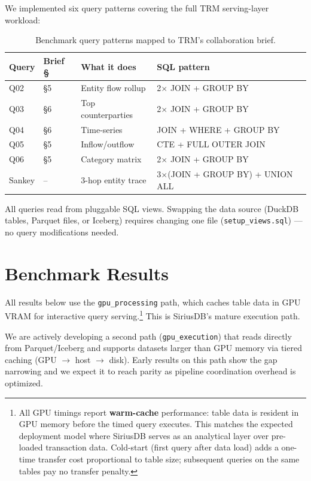 \documentclass[11pt,a4paper]{article}
\begin{document}
\noindent We implemented six query patterns covering the full TRM serving-layer workload:

\begin{table}[H]
\centering
\small
\begin{tabular}{@{}llll@{}}
\toprule
\textbf{Query} & \textbf{Brief \S} & \textbf{What it does} & \textbf{SQL pattern} \\
\midrule
Q02 & \S5 & Entity flow rollup & 2$\times$ JOIN + GROUP BY \\
Q03 & \S6 & Top counterparties & 2$\times$ JOIN + GROUP BY \\
Q04 & \S6 & Time-series & JOIN + WHERE + GROUP BY \\
Q05 & \S5 & Inflow/outflow & CTE + FULL OUTER JOIN \\
Q06 & \S5 & Category matrix & 2$\times$ JOIN + GROUP BY \\
Sankey & -- & 3-hop entity trace & 3$\times$(JOIN + GROUP BY) + UNION ALL \\
\bottomrule
\end{tabular}
\caption{Benchmark query patterns mapped to TRM's collaboration brief.}
\end{table}

All queries read from pluggable SQL views. Swapping the data source (DuckDB
tables, Parquet files, or Iceberg) requires changing one file
(\texttt{setup\_views.sql}) --- no query modifications needed.

\section{Benchmark Results}

All results below use the \texttt{gpu\_processing} path, which caches table
data in GPU VRAM for interactive query serving.\footnote{All GPU timings
report \textbf{warm-cache} performance: table data is resident in GPU memory
before the timed query executes. This matches the expected deployment model
where SiriusDB serves as an analytical layer over pre-loaded transaction data.
Cold-start (first query after data load) adds a one-time transfer cost
proportional to table size; subsequent queries on the same tables pay no
transfer penalty.} This is SiriusDB's mature execution path.

We are actively developing a second path (\texttt{gpu\_execution}) that reads
directly from Parquet/Iceberg and supports datasets larger than GPU memory via
tiered caching (GPU $\to$ host $\to$ disk). Early results on this path show the
gap narrowing and we expect it to reach parity as pipeline coordination overhead
is optimized.
\end{document}
